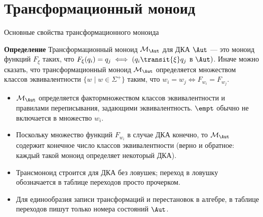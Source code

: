 \section{Трансформационный моноид} %
\begin{frame}{Основные свойства трансформационного моноида}
\vspace*{-6pt}
\begin{block}{\bf Определение}
Трансформационный моноид $\mathcal{M}_{\Aut}$ для ДКА $\Aut$ --- это моноид функций $F_{\xi}$ таких, что $F_{\xi}(q_i)= q_j\iff (q_i\transit{\xi} q_j$ в $\Aut)$. Иначе можно сказать, что трансформационный моноид $\mathcal{M}_{\Aut}$ определяется множеством классов эквивалентности
$\bigl\{w\mid w\in\Sigma^+\bigr\}$ таким, что $w_i = w_j\iff F_{w_i}=F_{w_j}$. 
\end{block} %
\begin{itemize}
\item $\mathcal{M}_{\Aut}$ определяется фактормножеством классов эквивалентности и правилами переписывания, задающими эквивалентность. $\empt$ обычно не включается в множество $w_i$.
\item Поскольку множество функций $F_{w_i}$ в случае ДКА конечно, то $\mathcal{M}_{\Aut}$ содержит конечное число классов эквивалентности (верно и обратное: каждый такой моноид определяет некоторый ДКА).
\item Трансмоноид строится для ДКА без ловушек; переход в ловушку обозначается в таблице переходов просто прочерком.
\item Для единообразия записи трансформаций и перестановок в алгебре, в таблице переходов пишут только номера состояний $\Aut$. 
\end{itemize} %
\end{frame}

